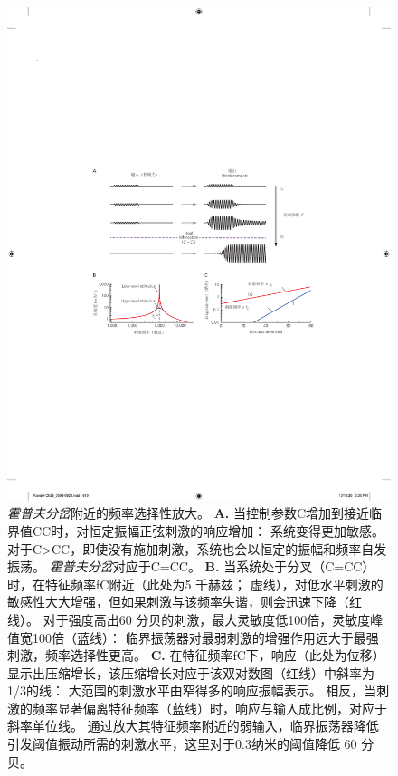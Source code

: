 \begin{figure}[htbp]
	\centering
	\includegraphics[width=0.9\linewidth]{chap26/fig_26_15}
	\caption{\textit{霍普夫分岔}附近的频率选择性放大。
		\textbf{A.} 当控制参数C增加到接近临界值CC时，对恒定振幅正弦刺激的响应增加：
		系统变得更加敏感。
		对于C>CC，即使没有施加刺激，系统也会以恒定的振幅和频率自发振荡。
		\textit{霍普夫分岔}对应于C=CC。
		\textbf{B.} 当系统处于分叉（C=CC）时，在特征频率fC附近（此处为5 千赫兹；
		虚线），对低水平刺激的敏感性大大增强，但如果刺激与该频率失谐，则会迅速下降（红线）。
		对于强度高出60 分贝的刺激，最大灵敏度低100倍，灵敏度峰值宽100倍（蓝线）：
		临界振荡器对最弱刺激的增强作用远大于最强刺激，频率选择性更高。
		\textbf{C.} 在特征频率fC下，响应（此处为位移）显示出压缩增长，该压缩增长对应于该双对数图（红线）中斜率为1/3的线：
		大范围的刺激水平由窄得多的响应振幅表示。
		相反，当刺激的频率显著偏离特征频率（蓝线）时，响应与输入成比例，对应于斜率单位线。
		通过放大其特征频率附近的弱输入，临界振荡器降低引发阈值振动所需的刺激水平，这里对于0.3纳米的阈值降低 60 分贝。}
	\label{fig:26_15}
\end{figure}


